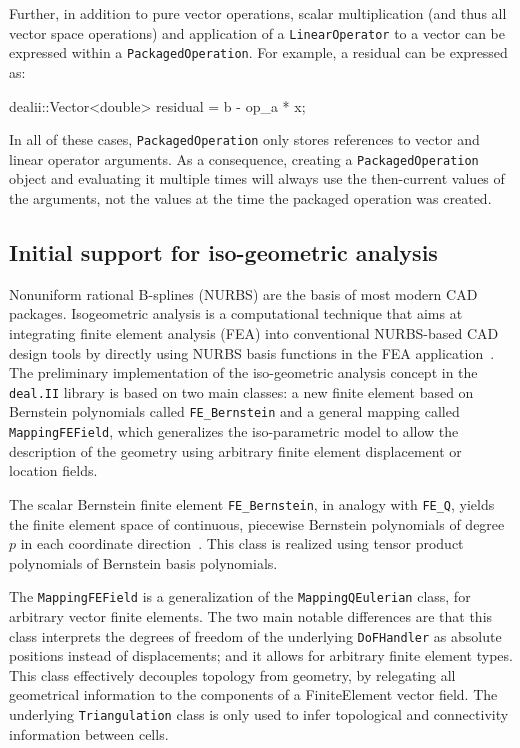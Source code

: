 \documentclass{ansarticle-preprint}
\newcommand{\specialword}[1]{\texttt{#1}}
\newcommand{\dealii}{{\specialword{deal.II}}}
\begin{document}
Further, in addition to pure vector operations, scalar multiplication
(and thus all vector space operations) and application of a
\texttt{LinearOperator} to a vector can be expressed within a
\texttt{PackagedOperation}. For example, a residual can be expressed as:
\begin{c++}
  dealii::Vector<double> residual =  b - op_a * x;
\end{c++}
In all of these cases, \texttt{PackagedOperation} only stores references to
vector and linear operator arguments. As a consequence, creating a
\texttt{PackagedOperation} object and evaluating it multiple times will always
use the then-current values of the arguments, not the values at the time the
packaged operation was created.

\subsection{Initial support for iso-geometric analysis}

Nonuniform rational B-splines (NURBS) are the basis of most modern CAD packages.
Isogeometric analysis is a computational technique that aims at integrating
finite element analysis (FEA) into conventional NURBS-based CAD design
tools by directly using NURBS basis functions in
the FEA application~\cite{Cottrell2009}. The preliminary
implementation of the iso-geometric analysis concept in the \dealii{} library
is based on two main classes: a new finite element based on Bernstein
polynomials called \verb|FE_Bernstein| and a general mapping called
\verb|MappingFEField|, which generalizes the iso-parametric model to allow
the description of the geometry using arbitrary finite element displacement or
location fields.

The scalar Bernstein finite element \verb|FE_Bernstein|, in analogy
with \verb|FE_Q|, yields the finite element space of continuous,
piecewise Bernstein polynomials of degree $p$ in each coordinate
direction~\cite{Cottrell2009}. This class is realized using tensor
product polynomials of Bernstein basis polynomials.

The \verb|MappingFEField| is a generalization of the
\verb|MappingQEulerian| class, for arbitrary vector finite elements. The
two main notable differences are that this class interprets the degrees of
freedom of the underlying \verb|DoFHandler| as absolute positions
instead of displacements; and it
allows for arbitrary finite element types.
This class effectively decouples topology from geometry, by relegating all
geometrical information to the components of a FiniteElement vector field.
The underlying \verb|Triangulation| class is only used to infer topological
and connectivity information between cells.
\end{document}
